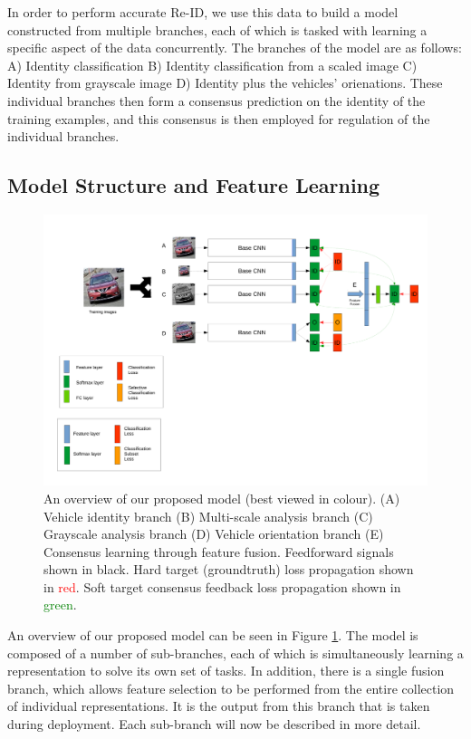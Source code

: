 \documentclass[10pt,twocolumn,letterpaper]{article}
\begin{document}
In order to perform accurate Re-ID, we use this data to build a model constructed from multiple branches, each of which is tasked with learning a specific aspect of the data concurrently. The branches of the model are as follows: A) Identity classification B) Identity classification from a scaled image C) Identity from grayscale image D) Identity plus the vehicles' orienations.
These individual branches then form a consensus prediction on the identity of the training examples, and this consensus is then employed for regulation of the individual branches.

\subsection{Model Structure and Feature Learning}

\begin{figure}
  \includegraphics[width=\linewidth,trim=0cm 8cm 0cm 0cm,clip=true]{images/system_overview_orient_only.pdf}
  \caption{An overview of our proposed model (best viewed in colour). (A) Vehicle identity branch (B) Multi-scale analysis branch (C) Grayscale analysis branch (D) Vehicle orientation branch
(E) Consensus learning through feature fusion. Feedforward signals shown in black. Hard target (groundtruth) loss propagation shown in \textcolor{red}{red}. Soft target consensus feedback loss propagation shown in \textcolor{green}{green}.}
  \label{F:overview}
\end{figure}

An overview of our proposed model can be seen in Figure \ref{F:overview}. The model is composed of a number of sub-branches, each of which is simultaneously learning a representation to solve its own set of tasks. In addition, there is a single fusion branch, which allows feature selection to be performed from the entire collection of individual representations. It is the output from this branch that is taken during deployment. Each sub-branch will now be described in more detail.
\end{document}
